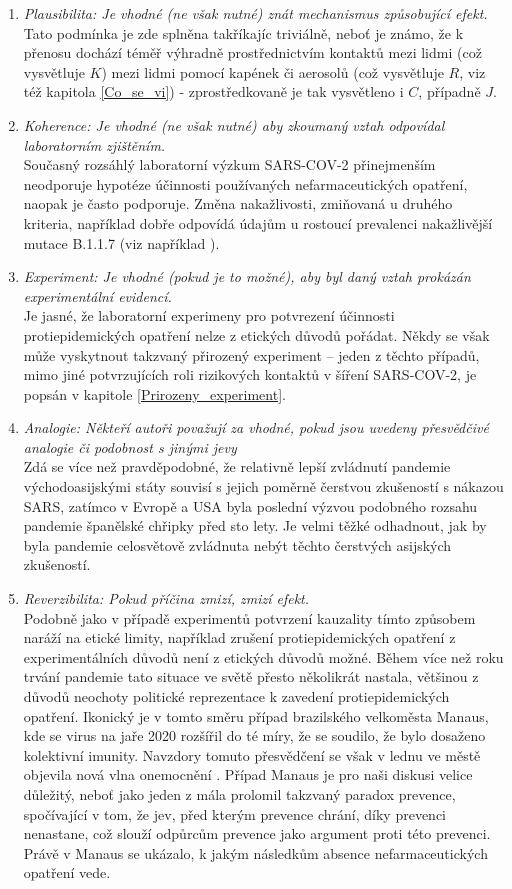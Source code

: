 \begin{enumerate}
\item \emph{Plausibilita: Je vhodné (ne však nutné) znát mechanismus způsobující
efekt.} \\
Tato podmínka je zde splněna takříkajíc triviálně, neboť je známo,
že k přenosu dochází téměř výhradně prostřednictvím kontaktů mezi lidmi
(což vysvětluje $K$) mezi lidmi pomocí kapének či aerosolů (což vysvětluje
$R$, viz též kapitola \ref{Co_se_vi}) - zprostředkovaně je tak vysvětleno i $C$, případně $J$.
\item \emph{Koherence: Je vhodné (ne však nutné) aby zkoumaný vztah odpovídal
laboratorním zjištěním.}\\
Současný rozsáhlý laboratorní výzkum SARS-COV-2 přinejmenším neodporuje
hypotéze účinnosti používaných nefarmaceutických opatření, naopak
je často podporuje. Změna nakažlivosti, zmiňovaná u druhého kriteria, například dobře odpovídá údajům u rostoucí prevalenci nakažlivější mutace B.1.1.7 (viz například \cite{diana}).
\item \emph{Experiment: Je vhodné (pokud je to možné), aby byl daný vztah
prokázán experimentální evidencí.}\\
Je jasné, že laboratorní experimeny pro potvrezení účinnosti protiepidemických
opatření nelze z etických důvodů pořádat. Někdy se však může vyskytnout
takzvaný přirozený experiment -- jeden z těchto případů, mimo jiné potvrzujících
roli rizikových kontaktů v šíření SARS-COV-2, je popsán v kapitole
\ref{Prirozeny_experiment}.
\item \emph{Analogie: Někteří autoři považují za vhodné, pokud jsou 
uvedeny přesvědčivé analogie či podobnost s jinými jevy}\\
Zdá se více než pravděpodobné, že relativně lepší zvládnutí pandemie
východoasijskými státy souvisí s jejich poměrně čerstvou zkušeností
s nákazou SARS, zatímco v Evropě a USA byla poslední 
výzvou podobného rozsahu pandemie španělské chřipky před sto lety. Je velmi těžké odhadnout,
jak by byla pandemie celosvětově zvládnuta nebýt těchto čerstvých
asijských zkušeností.
\item \emph{Reverzibilita: Pokud příčina zmizí, zmizí efekt.}\\
Podobně jako v případě experimentů potvrzení kauzality tímto způsobem
naráží na etické limity, například zrušení protiepidemických opatření z experimentálních
důvodů není z etických důvodů možné. Během více než roku trvání pandemie tato situace
ve světě přesto několikrát nastala, většinou z důvodů neochoty politické
reprezentace k zavedení protiepidemických opatření. Ikonický je v
tomto směru případ brazilského velkoměsta Manaus, kde se virus na
jaře 2020 rozšířil do té míry, že se soudilo, že bylo dosaženo kolektivní
imunity. Navzdory tomuto přesvědčení se však v lednu ve městě objevila
nová vlna onemocnění \cite{sabino2021resurgence}. 
Případ Manaus je pro naši diskusi velice důležitý, neboť jako jeden z mála
prolomil takzvaný paradox prevence, spočívající v tom, že jev, před kterým prevence chrání, díky prevenci nenastane, což slouží odpůrcům prevence jako argument proti této prevenci. Právě v Manaus se ukázalo, k jakým následkům absence nefarmaceutických opatření vede.

\end{enumerate}
